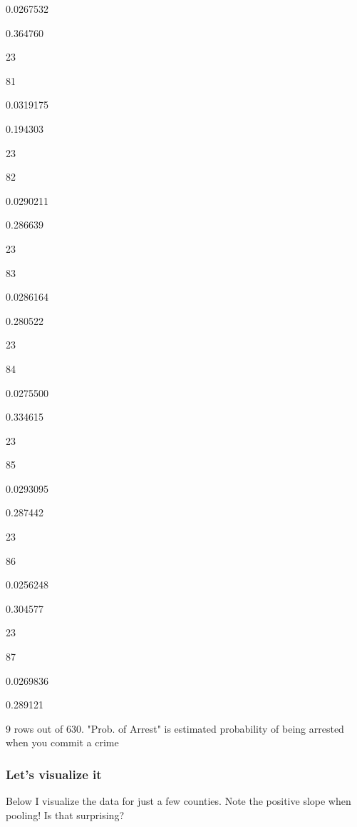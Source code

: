 \documentclass[
]{article}
\begin{document}
0.0267532

0.364760

23

81

0.0319175

0.194303

23

82

0.0290211

0.286639

23

83

0.0286164

0.280522

23

84

0.0275500

0.334615

23

85

0.0293095

0.287442

23

86

0.0256248

0.304577

23

87

0.0269836

0.289121

9 rows out of 630. "Prob. of Arrest" is estimated probability of being
arrested when you commit a crime

\hypertarget{lets-visualize-it}{%
\subsubsection{Let's visualize it}\label{lets-visualize-it}}

Below I visualize the data for just a few counties. Note the positive
slope when pooling! Is that surprising?
\end{document}

